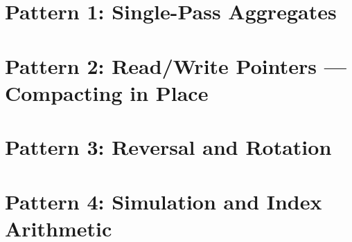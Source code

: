 \clearpage
\section{Pattern 1: Single-Pass Aggregates}
\label{sec:ch1-p1}





\clearpage
\section{Pattern 2: Read/Write Pointers --- Compacting in Place}
\label{sec:ch1-p2}





\clearpage
\section{Pattern 3: Reversal and Rotation}
\label{sec:ch1-p3}





\clearpage
\section{Pattern 4: Simulation and Index Arithmetic}
\label{sec:ch1-p4}





